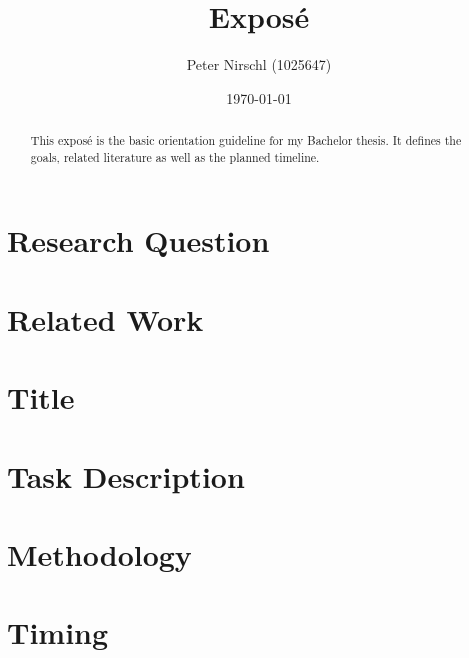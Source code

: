 \documentclass[a4paper]{article}
\title{Exposé}
\author{Peter Nirschl (1025647)}
\date{\today} %
\begin{document}
\maketitle
\begin{abstract}
This exposé is the basic orientation guideline for my Bachelor thesis.
It defines the goals, related literature as well as the planned timeline.
\end{abstract}
\setcounter{tocdepth}{1} %
\tableofcontents
\newpage

\section{Research Question}


\section{Related Work}


\section{Title}

\section{Task Description}

\section{Methodology}


\section{Timing}
\end{document}
